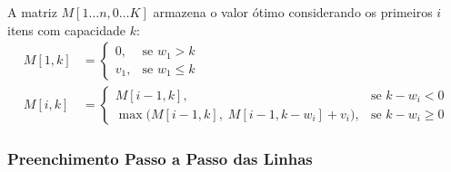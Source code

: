 \documentclass[11pt,a4paper]{article}
\begin{document}
A matriz $M[1 \dots n, 0 \dots K]$ armazena o valor ótimo considerando os primeiros $i$ itens com capacidade $k$:
\begin{align}
M[1, k] &= \begin{cases} 0, & \text{se } w_1 > k \\ v_1, & \text{se } w_1 \le k \end{cases} \\
M[i, k] &= \begin{cases} M[i-1, k], & \text{se } k - w_i < 0 \\ \max\Big(M[i-1, k], \; M[i-1, k - w_i] + v_i\Big), & \text{se } k - w_i \ge 0 \end{cases}
\end{align}

\subsubsection*{Preenchimento Passo a Passo das Linhas}
\end{document}

